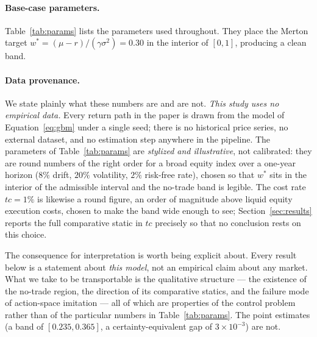 \documentclass[11pt]{article}
\begin{document}
\paragraph{Base-case parameters.}
Table~\ref{tab:params} lists the parameters used throughout. They place the
Merton target $w^{*}=(\mu-r)/(\gamma\sigma^2)=0.30$ in the interior of $[0,1]$,
producing a clean band.

\paragraph{Data provenance.}
We state plainly what these numbers are and are not. \emph{This study uses no
empirical data.} Every return path in the paper is drawn from the model of
Equation~\eqref{eq:gbm} under a single seed; there is no historical price
series, no external dataset, and no estimation step anywhere in the pipeline.
The parameters of Table~\ref{tab:params} are \emph{stylized and illustrative},
not calibrated: they are round numbers of the right order for a broad equity
index over a one-year horizon ($8\%$ drift, $20\%$ volatility, $2\%$ risk-free
rate), chosen so that $w^{*}$ sits in the interior of the admissible interval
and the no-trade band is legible. The cost rate $tc=1\%$ is likewise a round
figure, an order of magnitude above liquid equity execution costs, chosen to
make the band wide enough to see; Section~\ref{sec:results} reports the full
comparative static in $tc$ precisely so that no conclusion rests on this choice.

The consequence for interpretation is worth being explicit about. Every result
below is a statement about \emph{this model}, not an empirical claim about any
market. What we take to be transportable is the qualitative structure --- the
existence of the no-trade region, the direction of its comparative statics, and
the failure mode of action-space imitation --- all of which are properties of
the control problem rather than of the particular numbers in
Table~\ref{tab:params}. The point estimates (a band of $[0.235,0.365]$, a
certainty-equivalent gap of $3\times10^{-3}$) are not.
\end{document}

